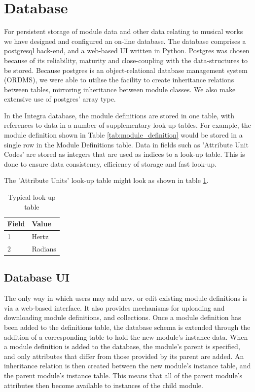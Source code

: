 \documentclass{article}
\newcommand\T{\rule{0pt}{2.6ex}}
\newcommand\B{\rule[-1.2ex]{0pt}{0pt}}
\begin{document}
\section{Database}\label{sec:database}

For persistent storage of module data and other data relating to musical works we have designed and configured an on-line database. The database comprises a postgresql back-end, and a web-based UI written in Python. Postgres was chosen because of its reliability, maturity and close-coupling with the data-structures to be stored. Because postgres is an object-relational database management system (ORDMS), we were able to utilise the facility to create inheritance relations between tables, mirroring inheritance between module classes. We also make extensive use of postgres' array type.

In the Integra database, the module definitions are stored in one table, with references to data in a number of supplementary look-up tables. For example, the module definition shown in Table \ref{tab:module_definition} would be stored in a single row in the Module Definitions table. Data in fields such as 'Attribute Unit Codes' are stored as integers that are used as indices to a look-up table. This is done to ensure data consistency, efficiency of storage and fast look-up.

The 'Attribute Units' look-up table might look as shown in table \ref{tab:lookup_table}.

\begin{table} 
\begin{center}
\begin{tabular}{|l|l|}
\hline
\textbf{Field} \T \B & \textbf{Value} \\
\hline
1 & Hertz \T \\
\hline
2 & Radians \T \\
\hline
\end{tabular} 
\end{center}
\caption{Typical look-up table}
\label{tab:lookup_table}
\end{table}

\subsection{Database UI}\label{subsec:db_ui}
The only way in which users may add new, or edit existing module definitions is via a web-based interface. It also provides mechanisms for uploading and downloading module definitions, and collections.
Once a module definition has been added to the definitions table, the database schema is extended through the addition of a corresponding table to hold the new module's instance data. When a module definition is added to the database, the module's parent is specified, and only attributes that differ from those provided by its parent are added. An inheritance relation is then created between the new module's instance table, and the parent module's instance table. This means that all of the parent module's attributes then become available to instances of the child module.
\end{document}
